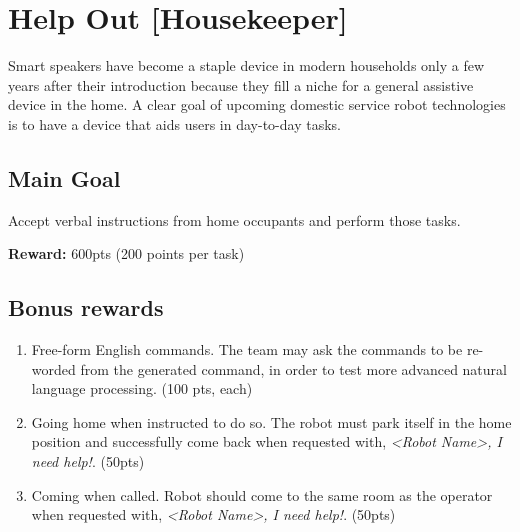 \section{Help Out [Housekeeper]}
Smart speakers have become a staple device in modern households only a few years after their introduction because they fill a niche for a general assistive device in the home. A clear goal of upcoming domestic service robot technologies is to have a device that aids users in day-to-day tasks.


\subsection{Main Goal}
Accept verbal instructions from home occupants and perform those tasks.

\noindent\textbf{Reward:} 600pts (200 points per task)\\

\subsection{Bonus rewards}
\begin{enumerate}[nosep]
	\item Free-form English commands. The team may ask the commands to be re-worded from the generated command, in order to test more advanced natural language processing. (100 pts, each)
	\item Going home when instructed to do so. The robot must park itself in the home position and successfully come back when requested with, \textit {<Robot Name>, I need help!}. (50pts)
	\item Coming when called. Robot should come to the same room as the operator when requested with, \textit {<Robot Name>, I need help!}. (50pts)
\end{enumerate}

%
%
